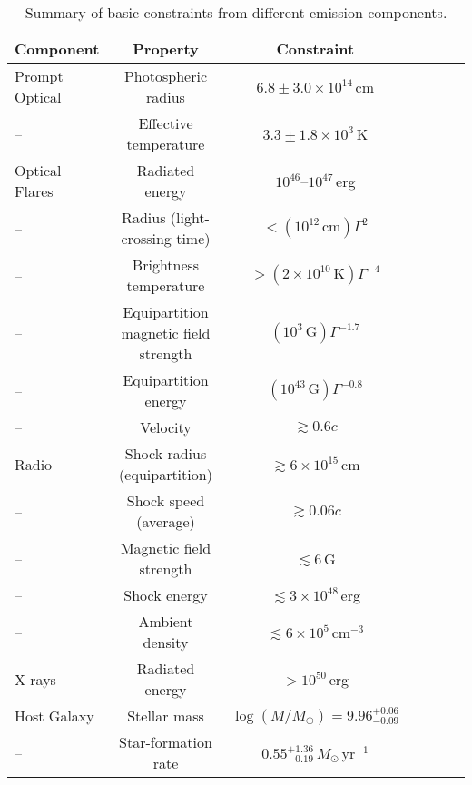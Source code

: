 \documentclass{nature_plusfigure}
\begin{document}
\begin{table}
\begin{center}
\caption{Summary of basic constraints from different emission components.}
\label{tab:flare-searches}
\begin{tabular}{lcccccc} 
\hline\hline
Component & Property & Constraint \\
\hline
Prompt Optical & Photospheric radius & $6.8\pm3.0\times10^{14}\,$cm \\
-- & Effective temperature & $3.3\pm1.8\times10^{3}\,$K \\
Optical Flares & Radiated energy & $10^{46}$--$10^{47}\,$erg \\
-- & Radius (light-crossing time) & $<(10^{12}\,\mathrm{cm})\Gamma^2$ \\
-- & Brightness temperature & $>(2\times10^{10}\,\mathrm{K})\Gamma^{-4}$ \\
-- & Equipartition magnetic field strength & $(10^{3}\,\mathrm{G})\Gamma^{-1.7}$ \\
-- & Equipartition energy & $(10^{43}\,\mathrm{G})\Gamma^{-0.8}$ \\
-- & Velocity & $\gtrsim0.6c$ \\
Radio & Shock radius (equipartition) & $\gtrsim6\times10^{15}\,$cm \\
-- & Shock speed (average) & $\gtrsim0.06c$ \\
-- & Magnetic field strength & $\lesssim6$\,G \\
-- & Shock energy & $\lesssim3\times10^{48}\,$erg \\
-- & Ambient density & $\lesssim6\times10^{5}\,$cm$^{-3}$ \\
X-rays & Radiated energy & $>10^{50}$\,erg \\
Host Galaxy & Stellar mass & $\log(M/M_\odot)=9.96^{+0.06}_{-0.09}$ \\
-- & Star-formation rate & $0.55^{+1.36}_{-0.19}\,M_\odot\,$yr$^{-1}$ \\
\hline
\end{tabular}
\end{center}
\end{table}

\clearpage


%
%
\end{document}
